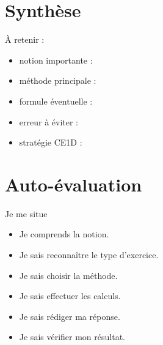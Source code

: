 \documentclass[11pt,a4paper]{article}
\begin{document}
\section{Synthèse}

\begin{cadresynthese}
À retenir :

\begin{itemize}
    \item notion importante : \dotfill
    \item méthode principale : \dotfill
    \item formule éventuelle : \dotfill
    \item erreur à éviter : \dotfill
    \item stratégie CE1D : \dotfill
\end{itemize}
\end{cadresynthese}

\section{Auto-évaluation}

\begin{cadregris}{Je me situe}
\begin{itemize}
    \item[$\square$] Je comprends la notion.
    \item[$\square$] Je sais reconnaître le type d’exercice.
    \item[$\square$] Je sais choisir la méthode.
    \item[$\square$] Je sais effectuer les calculs.
    \item[$\square$] Je sais rédiger ma réponse.
    \item[$\square$] Je sais vérifier mon résultat.
\end{itemize}
\end{cadregris}
\end{document}
